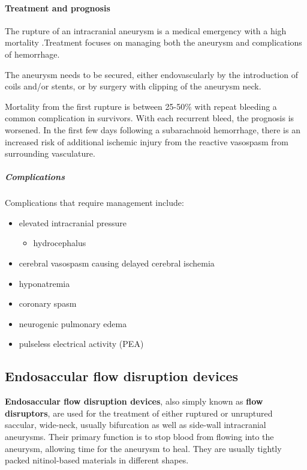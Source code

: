 \paragraph{Treatment and prognosis}

The rupture of an intracranial aneurysm is a medical emergency with a high mortality .Treatment focuses on managing both the aneurysm and complications of hemorrhage.

The aneurysm needs to be secured, either endovascularly by the introduction of coils and/or stents, or by surgery with clipping of the aneurysm neck.

Mortality from the first rupture is between 25-50\% with repeat bleeding a common complication in survivors. With each recurrent bleed, the prognosis is worsened. In the first few days following a subarachnoid hemorrhage, there is an increased risk of additional ischemic injury from the reactive vasospasm from surrounding vasculature.

\subparagraph{Complications}

Complications that require management include:

\begin{itemize}
	\item
	elevated intracranial pressure
	
	\begin{itemize}
		\item
		hydrocephalus
	\end{itemize}
	\item
	cerebral vasospasm causing delayed cerebral ischemia
	\item
	hyponatremia
	\item
	coronary spasm
	\item
	neurogenic pulmonary edema
	\item
	pulseless electrical activity (PEA)
\end{itemize}

\subsection{Endosaccular flow disruption devices}

\textbf{Endosaccular flow disruption devices}, also simply known as \textbf{flow disruptors}, are used for the treatment of either ruptured or unruptured saccular, wide-neck, usually bifurcation as well as side-wall intracranial aneurysms. Their primary function is to stop blood from flowing into the aneurysm, allowing time for the aneurysm to heal. They are usually tightly packed nitinol-based materials in different shapes.

